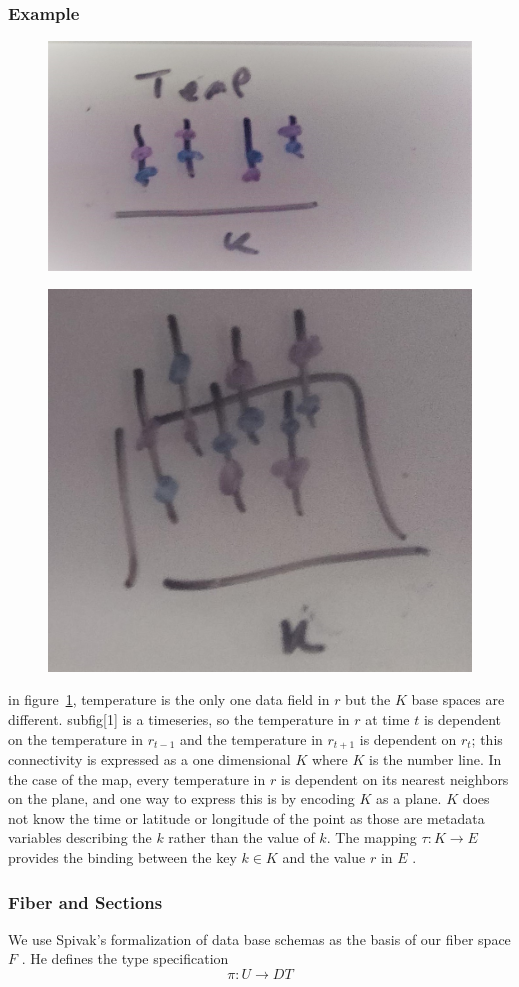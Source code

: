 \documentclass[../main.tex]{subfiles}
\begin{document}
\subsubsection{Example}
\begin{figure}[ht]
    \includegraphics[width=0.2\linewidth]{figures/sections/math/temp_1k.png}
    \label{fig:k_data}
\end{figure}

\begin{figure}[ht]
    \includegraphics[width=0.2\linewidth]{figures/sections/math/temp_2k.png}
\end{figure}

in figure~\ref{fig:k_data}, temperature is the only one data field in $r$ but the $K$ base spaces are different. subfig[1] is a timeseries, so the temperature in $r$ at time $t$ is dependent on the temperature in $r_{t-1}$ and the temperature in $r_{t+1}$ is dependent on  $r_t$; this connectivity is expressed as a one dimensional $K$ where $K$ is the number line. In the case of the map, every temperature in $r$ is dependent on its nearest neighbors on the plane, and one way to express this is by encoding $K$ as a plane. $K$ does not know the time or latitude or longitude of the point as those are metadata variables describing the $k$ rather than the value of $k$. The mapping $\tau: K \rightarrow E$ provides the binding between the key $k \in K$ and the value $r$ in $E$ \cite{munznerChDataAbstraction}.

\subsubsection{Fiber and Sections}
\label{sec:data_fiber}
We use Spivak's formalization of data base schemas as the basis of our fiber space $F$ \cite{spivakSIMPLICIALDATABASES}. He defines the type specification 
\begin{equation}
\pi: U \rightarrow DT
\end{equation}
\end{document}
